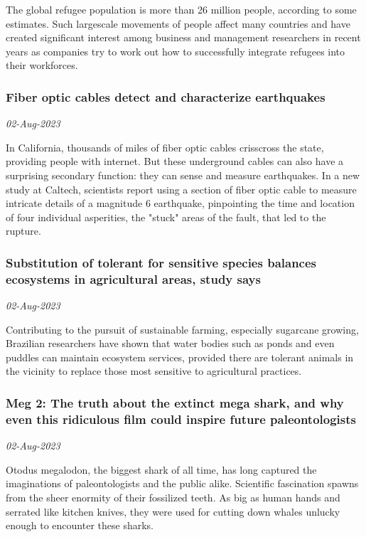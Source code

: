 The global refugee population is more than 26 million people, according to some estimates. Such largescale movements of people affect many countries and have created significant interest among business and management researchers in recent years as companies try to work out how to successfully integrate refugees into their workforces.
\subsubsection{Fiber optic cables detect and characterize earthquakes \href{https://phys.org/news/2023-08-fiber-optic-cables-characterize-earthquakes.html}{}}
\textit{02-Aug-2023}

In California, thousands of miles of fiber optic cables crisscross the state, providing people with internet. But these underground cables can also have a surprising secondary function: they can sense and measure earthquakes. In a new study at Caltech, scientists report using a section of fiber optic cable to measure intricate details of a magnitude 6 earthquake, pinpointing the time and location of four individual asperities, the "stuck" areas of the fault, that led to the rupture.
\subsubsection{Substitution of tolerant for sensitive species balances ecosystems in agricultural areas, study says \href{https://phys.org/news/2023-08-substitution-tolerant-sensitive-species-ecosystems.html}{}}
\textit{02-Aug-2023}

Contributing to the pursuit of sustainable farming, especially sugarcane growing, Brazilian researchers have shown that water bodies such as ponds and even puddles can maintain ecosystem services, provided there are tolerant animals in the vicinity to replace those most sensitive to agricultural practices.
\subsubsection{Meg 2: The truth about the extinct mega shark, and why even this ridiculous film could inspire future paleontologists \href{https://phys.org/news/2023-08-meg-truth-extinct-mega-shark.html}{}}
\textit{02-Aug-2023}

Otodus megalodon, the biggest shark of all time, has long captured the imaginations of paleontologists and the public alike. Scientific fascination spawns from the sheer enormity of their fossilized teeth. As big as human hands and serrated like kitchen knives, they were used for cutting down whales unlucky enough to encounter these sharks.
